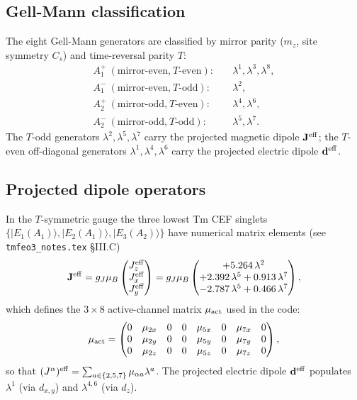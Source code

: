 \documentclass[11pt]{article}
\newcommand{\Jeff}{\mathbf{J}^{\rm eff}}
\newcommand{\deff}{\mathbf{d}^{\rm eff}}
\begin{document}
\subsection{Gell-Mann classification}

The eight Gell-Mann generators are classified by mirror parity ($m_z$,
site symmetry $C_s$) and time-reversal parity $T$:
\begin{equation}
\boxed{
\begin{aligned}
A_1^+\ (\text{mirror-even,}\ T\text{-even}):&\quad\lambda^1,\lambda^3,\lambda^8,\\
A_1^-\ (\text{mirror-even,}\ T\text{-odd}):&\quad\lambda^2,\\
A_2^+\ (\text{mirror-odd,}\ T\text{-even}):&\quad\lambda^4,\lambda^6,\\
A_2^-\ (\text{mirror-odd,}\ T\text{-odd}):&\quad\lambda^5,\lambda^7.
\end{aligned}}
\label{eq:lambdaclass}
\end{equation}
The $T$-odd generators $\lambda^2, \lambda^5, \lambda^7$ carry
the projected magnetic dipole $\Jeff$; the $T$-even off-diagonal
generators $\lambda^1, \lambda^4, \lambda^6$ carry the projected electric
dipole $\deff$.

\subsection{Projected dipole operators}

In the $T$-symmetric gauge the three lowest Tm CEF singlets
$\{|E_1(A_1)\rangle, |E_2(A_1)\rangle, |E_3(A_2)\rangle\}$ have
numerical matrix elements (see \texttt{tmfeo3\_notes.tex} \S III.C)
\begin{equation}
\Jeff = g_J\mu_B\begin{pmatrix}
J_z^{\rm eff} \\ J_x^{\rm eff} \\ J_y^{\rm eff}
\end{pmatrix}
= g_J\mu_B\begin{pmatrix}
+5.264\,\lambda^2 \\
+2.392\,\lambda^5 + 0.913\,\lambda^7 \\
-2.787\,\lambda^5 + 0.466\,\lambda^7
\end{pmatrix},
\label{eq:Jeff}
\end{equation}
which defines the $3\times 8$ active-channel matrix $\mu_{\rm act}$
used in the code:
\begin{equation}
\mu_{\rm act} =
\begin{pmatrix}
0 & \mu_{2x} & 0 & 0 & \mu_{5x} & 0 & \mu_{7x} & 0 \\
0 & \mu_{2y} & 0 & 0 & \mu_{5y} & 0 & \mu_{7y} & 0 \\
0 & \mu_{2z} & 0 & 0 & \mu_{5z} & 0 & \mu_{7z} & 0
\end{pmatrix},
\end{equation}
so that $(J^\alpha)^{\rm eff} = \sum_{a\in\{2,5,7\}}\mu_{\alpha a}\lambda^a$.
The projected electric dipole $\deff$ populates $\lambda^1$ (via $d_{x,y}$)
and $\lambda^{4,6}$ (via $d_z$).
\end{document}

